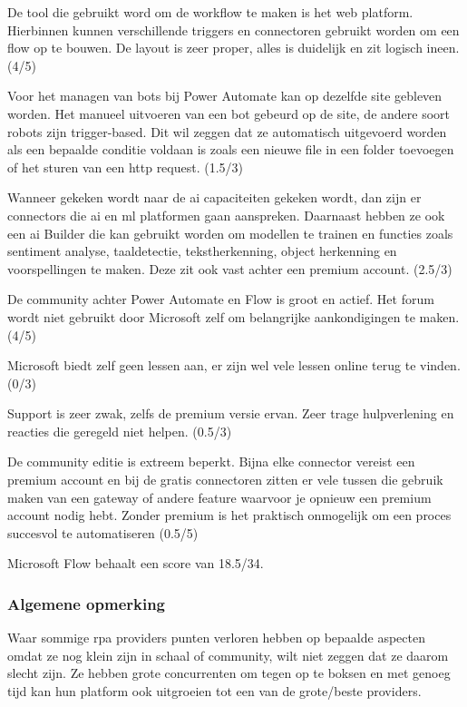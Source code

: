 De tool die gebruikt word om de \gls{workflow} te maken is het web platform. Hierbinnen kunnen verschillende triggers en connectoren gebruikt worden om een flow op te bouwen. De layout is zeer proper, alles is duidelijk en zit logisch ineen. (4/5)

Voor het managen van bots bij Power Automate kan op dezelfde site gebleven worden. Het manueel uitvoeren van een bot gebeurd op de site, de andere soort robots zijn trigger-based. Dit wil zeggen dat ze automatisch uitgevoerd worden als een bepaalde conditie voldaan is zoals een nieuwe file in een folder toevoegen of het sturen van een \acrshort{http} request. (1.5/3)

Wanneer gekeken wordt naar de \acrshort{ai} capaciteiten gekeken wordt, dan zijn er connectors die \acrshort{ai} en \acrshort{ml} platformen gaan aanspreken. Daarnaast hebben ze ook een \acrshort{ai} Builder die kan gebruikt worden om modellen te trainen en functies zoals sentiment analyse, taaldetectie, tekstherkenning, object herkenning en voorspellingen te maken. Deze zit ook vast achter een premium account. (2.5/3)

De community achter Power Automate en Flow is groot en actief. Het forum wordt niet gebruikt door Microsoft zelf om belangrijke aankondigingen te maken. (4/5)

Microsoft biedt zelf geen lessen aan, er zijn wel vele lessen online terug te vinden. (0/3)

Support is zeer zwak, zelfs de premium versie ervan. Zeer trage hulpverlening en reacties die geregeld niet helpen. (0.5/3)

De community editie is extreem beperkt. Bijna elke connector vereist een premium account en bij de gratis connectoren zitten er vele tussen die gebruik maken van een gateway of andere feature waarvoor je opnieuw een premium account nodig hebt. Zonder premium is het praktisch onmogelijk om een proces succesvol te automatiseren (0.5/5)

Microsoft Flow behaalt een score van 18.5/34.


\subsubsection{Algemene opmerking}
Waar sommige \acrshort{rpa} providers punten verloren hebben op bepaalde aspecten omdat ze nog klein zijn in schaal of community, wilt niet zeggen dat ze daarom slecht zijn. Ze hebben grote concurrenten om tegen op te boksen en met genoeg tijd kan hun platform ook uitgroeien tot een van de grote/beste providers.

